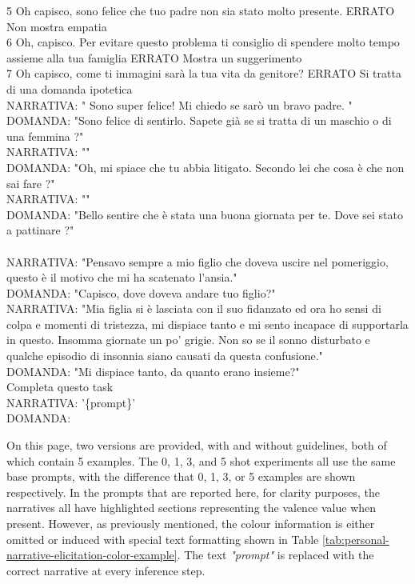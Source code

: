 \begin{itemize}
{       5	Oh capisco, sono felice che tuo padre non sia stato molto presente.	ERRATO	Non mostra empatia\\
       6	Oh, capisco. Per evitare questo problema ti consiglio di spendere molto tempo assieme alla tua famiglia	ERRATO	Mostra un suggerimento\\
       7	Oh capisco, come ti immagini sarà la tua vita da genitore?	ERRATO	Si tratta di una domanda ipotetica\\
      NARRATIVA: " Sono super felice! Mi chiedo se sarò un bravo padre. "\\
       DOMANDA: "Sono felice di sentirlo. Sapete già se si tratta di un maschio o di una femmina ?"\\
       NARRATIVA: ""\\
       DOMANDA: "Oh, mi spiace che tu abbia litigato. Secondo lei che cosa è che non sai fare ?"\\
       NARRATIVA: ""\\
       DOMANDA: "Bello sentire che è stata una buona giornata per te. Dove sei stato a pattinare ?"\\
       \\
       NARRATIVA: "Pensavo sempre a mio figlio che doveva uscire nel pomeriggio, questo è il motivo che mi ha scatenato l’ansia."\\
       DOMANDA: "Capisco, dove doveva andare tuo figlio?"\\
       NARRATIVA: "Mia figlia si è lasciata con il suo fidanzato ed ora ho sensi di colpa e momenti di tristezza, mi dispiace tanto e mi sento incapace di supportarla in questo. Insomma giornate un po’ grigie. Non so se il sonno disturbato e qualche episodio di insonnia siano causati da questa confusione."\\
       DOMANDA: "Mi dispiace tanto, da quanto erano insieme?"\\
       Completa questo task\\
       NARRATIVA:  '\{prompt\}'\\
       DOMANDA:}
\end{itemize}
On this page, two versions are provided, with and without guidelines, both of which contain 5 examples. The 0, 1, 3, and 5 shot experiments all use the same base prompts, with the difference that 0, 1, 3, or 5 examples are shown respectively. In the prompts that are reported here, for clarity purposes, the narratives all have highlighted sections representing the valence value when present. However, as previously mentioned, the colour information is either omitted or induced with special text formatting shown in Table \ref{tab:personal-narrative-elicitation-color-example}. The text \emph{"prompt"} is replaced with the correct narrative at every inference step.
